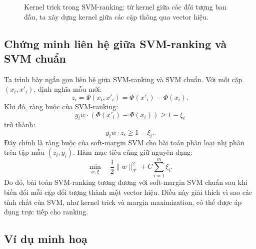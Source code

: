 \begin{figure}[H]
    \centering
    \caption{Kernel trick trong SVM-ranking: từ kernel giữa các đối tượng ban đầu, ta xây dựng kernel giữa các cặp thông qua vector hiệu.}
    \label{fig:section4-pairwise-kernel-trick}
\end{figure}

\subsection{Chứng minh liên hệ giữa SVM-ranking và SVM chuẩn}

Ta trình bày ngắn gọn liên hệ giữa SVM-ranking và SVM chuẩn. Với mỗi cặp \((x_i,x'_i)\), định nghĩa mẫu mới:
\[
    z_i
    =
    \Psi(x_i,x'_i)
    =
    \Phi(x'_i)-\Phi(x_i).
\]
Khi đó, ràng buộc của SVM-ranking:
\[
    y_i
    w\cdot
    \left(
        \Phi(x'_i)-\Phi(x_i)
    \right)
    \geq
    1-\xi_i
\]
trở thành:
\[
    y_i w\cdot z_i
    \geq
    1-\xi_i.
\]
Đây chính là ràng buộc của soft-margin SVM cho bài toán phân loại nhị phân trên tập mẫu \((z_i,y_i)\). Hàm mục tiêu cũng giữ nguyên dạng:
\[
    \min_{w,\xi}
    \quad
    \frac{1}{2}\|w\|_{\mathcal{F}}^2
    +
    C
    \sum_{i=1}^{m}
    \xi_i.
\]
Do đó, bài toán SVM-ranking tương đương với soft-margin SVM chuẩn sau khi biến đổi mỗi cặp đối tượng thành một vector hiệu. Điều này giải thích vì sao các tính chất của SVM, như kernel trick và margin maximization, có thể được áp dụng trực tiếp cho ranking.

\subsection{Ví dụ minh hoạ}

